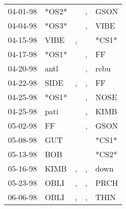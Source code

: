 \begin{supertabular}{p{0.07\textwidth}p{0.06\textwidth}p{0.02\textwidth}p{0.02\textwidth}p{0.06\textwidth}}
          04-01-98\textsuperscript{} &                            *OS2* &                  &                , &           GSON\textsuperscript{} \\
          04-04-98\textsuperscript{} &                            *OS3* &                  &                , &           VIBE\textsuperscript{} \\
          04-15-98\textsuperscript{} &           VIBE\textsuperscript{} &                , &                  &                            *CS1* \\
          04-17-98\textsuperscript{} &                            *OS1* &                  &                , &             FF\textsuperscript{} \\
          04-20-98\textsuperscript{} &           antl\textsuperscript{} &                  &                , &           rebu\textsuperscript{} \\
          04-22-98\textsuperscript{} &           SIDE\textsuperscript{} &                , &                , &             FF\textsuperscript{} \\
          04-25-98\textsuperscript{} &                            *OS1* &                  &                , &           NOSE\textsuperscript{} \\
          04-25-98\textsuperscript{} &           pati\textsuperscript{} &                  &                , &           KIMB\textsuperscript{} \\
          05-02-98\textsuperscript{} &             FF\textsuperscript{} &                  &                , &           GSON\textsuperscript{} \\
          05-08-98\textsuperscript{} &            GUT\textsuperscript{} &                  &                  &                            *CS1* \\
          05-13-98\textsuperscript{} &            BOB\textsuperscript{} &                  &                  &                            *CS2* \\
          05-16-98\textsuperscript{} &           KIMB\textsuperscript{} &                , &                , &           down\textsuperscript{} \\
          05-23-98\textsuperscript{} &           OBLI\textsuperscript{} &                , &                , &           PRCH\textsuperscript{} \\
          06-06-98\textsuperscript{} &           OBLI\textsuperscript{} &                , &                , &           THIN\textsuperscript{} \\

\end{supertabular}
